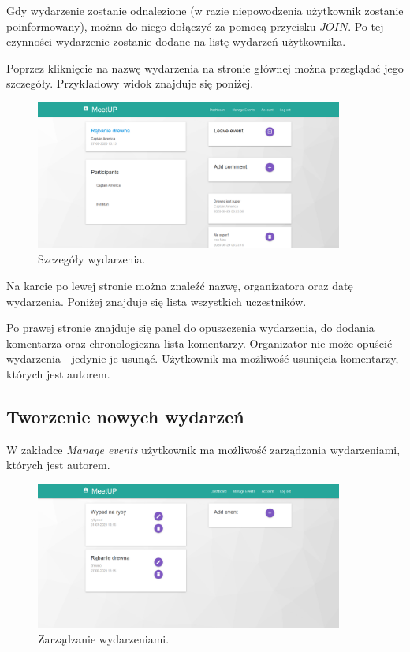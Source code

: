 \documentclass[12pt]{article}
\begin{document}
Gdy wydarzenie zostanie odnalezione (w razie niepowodzenia użytkownik zostanie poinformowany), można do niego dołączyć za pomocą przycisku $JOIN$. Po tej czynności wydarzenie zostanie dodane na listę wydarzeń użytkownika.

Poprzez kliknięcie na nazwę wydarzenia na stronie głównej można przeglądać jego szczegóły. Przykładowy widok znajduje się poniżej.

\begin{figure}[H]
\centering
\includegraphics[width=0.9\textwidth]{meetup_event_details.png}
\caption{Szczegóły wydarzenia.}
\end{figure}

Na karcie po lewej stronie można znaleźć nazwę, organizatora oraz datę wydarzenia. Poniżej znajduje się lista wszystkich uczestników.

Po prawej stronie znajduje się panel do opuszczenia wydarzenia, do dodania komentarza oraz chronologiczna lista komentarzy. Organizator nie może opuścić wydarzenia - jedynie je usunąć. Użytkownik ma możliwość usunięcia komentarzy, których jest autorem.

\subsection{Tworzenie nowych wydarzeń}

W zakładce \textit{Manage events} użytkownik ma możliwość zarządzania wydarzeniami, których jest autorem.

\begin{figure}[H]
\centering
\includegraphics[width=0.9\textwidth]{meetup_manage.png}
\caption{Zarządzanie wydarzeniami.}
\end{figure}
\end{document}
